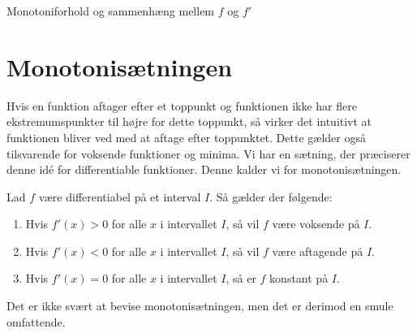 \begin{center}
\Huge
Monotoniforhold og sammenhæng mellem $f$ og $f'$
\end{center}
\section*{Monotonisætningen}
Hvis en funktion aftager efter et toppunkt og funktionen ikke har flere ekstremumspunkter til højre for dette toppunkt, så virker det intuitivt at funktionen bliver ved med at aftage efter toppunktet. Dette gælder også tilsvarende for voksende funktioner og minima. Vi har en sætning, der præciserer denne idé for differentiable funktioner. Denne kalder vi for monotonisætningen. 
\begin{setn}[Monotonisætningen]
Lad $f$ være differentiabel på et interval $I$. Så gælder der følgende:
\begin{enumerate}[label=\roman*)]
\item Hvis $f'(x)>0$ for alle $x$ i intervallet $I$, så vil $f$ være voksende på $I$.
\item Hvis $f'(x)<0$ for alle $x$ i intervallet $I$, så vil $f$ være aftagende på $I$. 
\item Hvis $f'(x)=0$ for alle $x$ i intervallet $I$, så er $f$ konstant på $I$.
\end{enumerate}
\end{setn}
Det er ikke svært at bevise monotonisætningen, men det er derimod en smule omfattende. 

